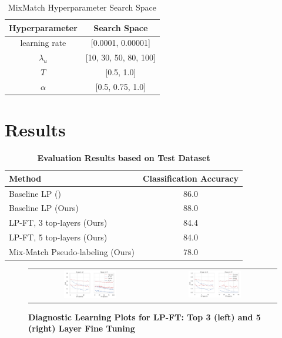 \documentclass{article}
\begin{document}
\begin{table}[!ht]
\centering
\begin{tabular}{|c|c|}
\hline
\textbf{Hyperparameter} & \textbf{Search Space} \\ \hline
learning rate & [0.0001, 0.00001] \\ \hline
$\lambda_u$ & [10, 30, 50, 80, 100] \\ \hline
$T$ & [0.5, 1.0] \\ \hline
$\alpha$ & [0.5, 0.75, 1.0] \\ \hline
\end{tabular}
\caption{MixMatch Hyperparameter Search Space}
\label{table:mixmatch-search}
\end{table}



\section{Results}

\begin{table}[!ht]
    \centering
    \begin{tabular}{| l | c |}
    \hline
    \textbf{Method} & \textbf{Classification Accuracy} \\ \hline
    Baseline LP (\cite{awangiskandar2020}) & 86.0 \\ \hline
    Baseline LP (Ours) & 88.0 \\ \hline
    LP-FT, 3 top-layers (Ours) & 84.4 \\ \hline
    LP-FT, 5 top-layers (Ours) & 84.0 \\ \hline
    Mix-Match Pseudo-labeling (Ours) & 78.0 \\ \hline
    \end{tabular}
    \caption{\textbf{Evaluation Results based on Test Dataset}}
    \label{table: test_acc_table}
\end{table}

\begin{figure}[!ht]
    \centering
    \begin{tabular}{c c}    
    \includegraphics[width=0.45\textwidth]{lp_ft_3.png}
    &
    \includegraphics[width=0.45\textwidth]{lp_ft_5.png}
    \end{tabular}
    \caption{\textbf{Diagnostic Learning Plots for LP-FT: Top 3 (left) and 5 (right) Layer Fine Tuning}}
    \label{figure: diag_plot_lpft}
\end{figure}
\end{document}
